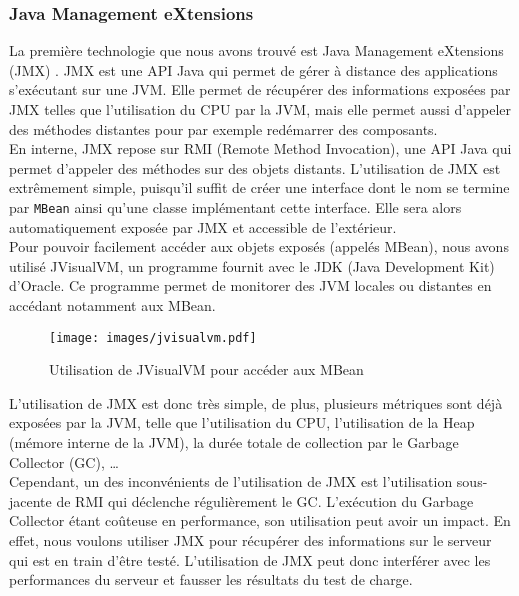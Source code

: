 \subsubsection{Java Management eXtensions}

La première technologie que nous avons trouvé est Java Management eXtensions (JMX) \cite{jmx}. JMX est une API Java qui permet de gérer à distance des applications s'exécutant sur une JVM. Elle permet de récupérer des informations exposées par JMX telles que l'utilisation du CPU par la JVM, mais elle permet aussi d'appeler des méthodes distantes pour par exemple redémarrer des composants.\\

En interne, JMX repose sur RMI (Remote Method Invocation), une API Java qui permet d'appeler des méthodes sur des objets distants. L'utilisation de JMX est extrêmement simple, puisqu'il suffit de créer une interface dont le nom se termine par \verb+MBean+ ainsi qu'une classe implémentant cette interface. Elle sera alors automatiquement exposée par JMX et accessible de l'extérieur.\\

Pour pouvoir facilement accéder aux objets exposés (appelés MBean), nous avons utilisé JVisualVM, un programme fournit avec le JDK (Java Development Kit) d'Oracle. Ce programme permet de monitorer des JVM locales ou distantes en accédant notamment aux MBean.

\begin{figure}[H]
 \centering
 \texttt{[image: images/jvisualvm.pdf]}
 \caption{Utilisation de JVisualVM pour accéder aux MBean}
\end{figure}


L'utilisation de JMX est donc très simple, de plus, plusieurs métriques sont déjà exposées par la JVM, telle que l'utilisation du CPU, l'utilisation de la Heap (mémore interne de la JVM), la durée totale de collection par le Garbage Collector (GC), \dots{}\\

Cependant, un des inconvénients de l'utilisation de JMX est l'utilisation sous-jacente de RMI qui déclenche régulièrement le GC. L'exécution du Garbage Collector étant coûteuse en performance, son utilisation peut avoir un impact. En effet, nous voulons utiliser JMX pour récupérer des informations sur le serveur qui est en train d'être testé. L'utilisation de JMX peut donc interférer avec les performances du serveur et fausser les résultats du test de charge.

